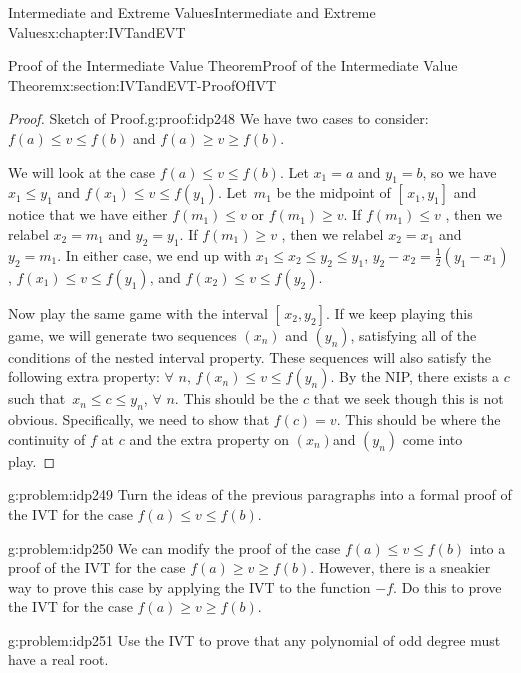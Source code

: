 \begin{chapterptx}{Intermediate and Extreme Values}{}{Intermediate and Extreme Values}{}{}{x:chapter:IVTandEVT}
\begin{sectionptx}{Proof of the Intermediate Value Theorem}{}{Proof of the Intermediate Value Theorem}{}{}{x:section:IVTandEVT-ProofOfIVT}
\begin{proof}{Sketch of Proof.}{g:proof:idp248}
			We have two cases to consider: \(f(a)\leq v\leq f(b)\) and \(f(a)\geq v\geq f(b)\).%
			\par
			We will look at the case \(f(a)\leq v\leq f(b)\). Let \(x_1=a\) and \(y_1=b\), so we have \(x_1\leq y_1\) and \(f(x_1)\leq v\leq f(y_1)\). Let \(\,m_1\) be the midpoint of \([\,x_1,y_1]\) and notice that we have either \(f(m_1)\leq v\) or \(f(m_1)\geq v\). If \(f(m_1)\leq v\) , then we relabel \(x_2=m_1\) and \(y_2=y_1\). If \(f(m_1)\geq v\) , then we relabel \(x_2=x_1\) and \(y_2=m_1\). In either case, we end up with \(x_1\leq x_2\leq y_2\leq y_1\), \(y_2-x_2=\frac{1}{2}\left(y_1-x_1\right)\), \(f(x_1)\leq v\leq f(y_1)\), and \(f(x_2)\leq v\leq f(y_2)\).%
			\par
			Now play the same game with the interval \([\,x_2,y_2]\). If we keep playing this game, we will generate two sequences \(\left(x_n\right)\) and \(\left(y_n\right)\), satisfying all of the conditions of the nested interval property. These sequences will also satisfy the following extra property: \(\forall\) \(n,\,f(x_n)\leq v\leq f(y_n)\). By the NIP, there exists a \(c\) such that \(\,x_n\leq c\leq y_n\), \(\forall\) \(n\). This should be the \(c\) that we seek though this is not obvious. Specifically, we need to show that \(f(c)=v\). This should be where the continuity of \(f\) at \(c\) and the extra property on \(\left(x_n\right)\)and \(\left(y_n\right)\) come into play.%
		\end{proof}
		\begin{problem}{}{g:problem:idp249}%
			 Turn the ideas of the previous paragraphs into a formal proof of the IVT for the case \(f(a)\leq v\leq f(b)\).%
		\end{problem}
		\begin{problem}{}{g:problem:idp250}%
			 We can modify the proof of the case \(f(a)\leq v\leq f(b)\) into a proof of the IVT for the case \(f(a)\geq v\geq f(b)\). However, there is a sneakier way to prove this case by applying the IVT to the function \(-f\). Do this to prove the IVT for the case \(f(a)\geq v\geq f(b)\).%
		\end{problem}
		\begin{problem}{}{g:problem:idp251}%
			 Use the IVT to prove that any polynomial of odd degree must have a real root.%

\end{problem}
\end{sectionptx}
\end{chapterptx}
